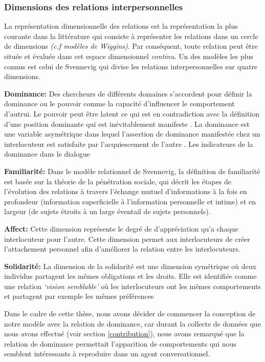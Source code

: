 \documentclass [french]{sig-alternate-05-2015}
\begin{document}
\subsubsection{Dimensions des relations interpersonnelles}
La représentation dimensionnelle des relations est la représentation la plus courante dans la littérature qui consiste à représenter les relations dans un cercle de dimensions \emph{(c.f modèles de Wiggins)}. Par conséquent, toute relation peut être située et évaluée dans cet espace dimensionnel \textit{continu}. Un des modèles les plus connus est celui de Svennevig \cite{svennevig2000getting} qui divise les relations interpersonnelles sur quatre dimensions. 
\par \textbf{Dominance:} Des chercheurs de différents domaines s'accordent pour définir la dominance ou le pouvoir comme la capacité d'influencer le comportement d'autrui. Le pouvoir peut être latent \cite{komter1989hidden} ce qui est en contradiction avec la définition d'une position dominante qui est inévitablement manifeste \cite{dunbar2005perceptions}. La dominance est une variable asymétrique dans lequel l'assertion de dominance manifestée chez un interlocuteur est satisfaite par l'acquiescement de l'autre \cite{rogers1979domineeringness}.
{\color{red}
Les indicateurs de la dominance dans le dialogue
}
\par \textbf{Familiarité:} Dans le modèle relationnel de Svennevig, la définition de familiarité est basée sur la théorie de la pénétration sociale, qui décrit les étapes de l'évolution des relations à travers l'échange mutuel d'informations à la fois en profondeur (information superficielle à l'information personnelle et intime) et en largeur (de sujets étroits à un large éventail de sujets personnels).

\par \textbf{Affect:} Cette dimension représente le degré de d'appréciation qu'a chaque interlocuteur pour l'autre. Cette dimension permet aux interlocuteurs de créer l'attachement personnel afin d'améliorer la relation entre les interlocuteurs\cite{nicholson2001role}.
	
\par \textbf{Solidarité:} La dimension de la solidarité est une dimension symétrique où deux individus partagent les mêmes obligations et les droits. Elle est identifiée comme une  relation  \emph{‘vision semblable’} où les interlocuteurs ont les mêmes comportements et partagent par exemple les mêmes préférences

\par Dans le cadre de cette thèse, nous avons décider de commencer la conception de notre modèle avec la relation de dominance, car durant la collecte de données que nous avons effectué (voir section \ref{contribution}), nous avons remarqué que la relation de dominance permettait l'apparition de comportements qui nous semblent intéressants à reproduire dans un agent conversationnel. 
\end{document}
